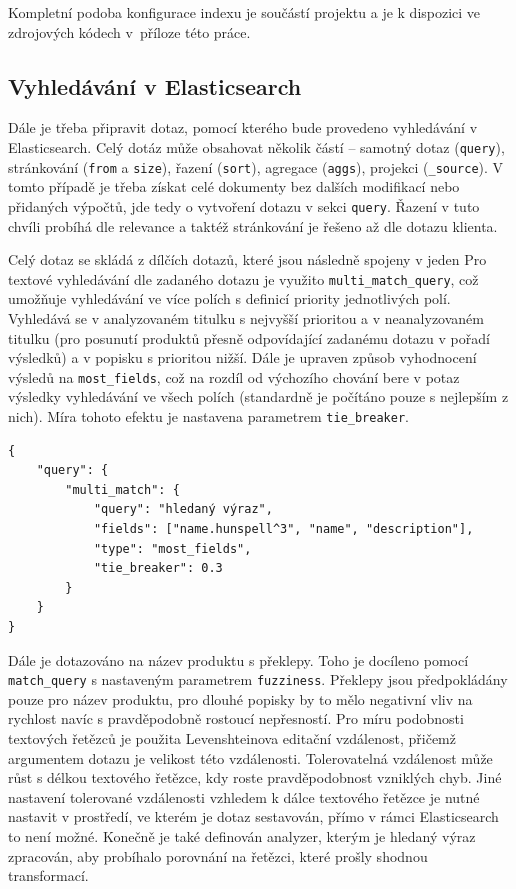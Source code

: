 \documentclass[FM,DP]{tulthesis}
\newenvironment{code}
    {\filbreak\captionsetup{type=listing}}{\filbreak}
\begin{document}
Kompletní podoba konfigurace indexu je součástí projektu a je k dispozici ve zdrojových kódech 
v~příloze této práce.

\subsection{Vyhledávání v Elasticsearch}

Dále je třeba připravit dotaz, pomocí kterého bude provedeno vyhledávání v Elasticsearch.
Celý dotáz může obsahovat několik částí -- samotný dotaz (\verb|query|), stránkování 
(\verb|from| a \verb|size|), řazení (\verb|sort|), agregace (\verb|aggs|), projekci
(\verb|_source|). V tomto případě je třeba získat celé dokumenty bez dalších modifikací
nebo přidaných výpočtů, jde tedy o vytvoření dotazu v sekci \verb|query|. Řazení v tuto 
chvíli probíhá dle relevance a taktéž stránkování je řešeno až dle dotazu klienta.

Celý dotaz se skládá z dílčích dotazů, které jsou následně spojeny v jeden
Pro textové vyhledávání dle zadaného dotazu je využito \verb|multi_match_query|, 
což umožňuje vyhledávání ve více polích s definicí priority jednotlivých polí.
Vyhledává se v analyzovaném titulku s nejvyšší prioritou a v neanalyzovaném titulku (pro posunutí
produktů přesně odpovídající zadanému dotazu v pořadí výsledků) a v popisku s prioritou nižší.
Dále je upraven způsob vyhodnocení výsledů na \verb|most_fields|, což na rozdíl
od výchozího chování bere v potaz výsledky vyhledávání ve všech polích (standardně je počítáno
pouze s nejlepším z nich). Míra tohoto efektu je nastavena parametrem \verb|tie_breaker|.

\begin{code}
\captionsetup{singlelinecheck=false,justification=raggedright}
\label{code:es-search-1}
\begin{verbatim}
{
    "query": {
        "multi_match": {
            "query": "hledaný výraz", 
            "fields": ["name.hunspell^3", "name", "description"],
            "type": "most_fields",
            "tie_breaker": 0.3
        }
    }
}
\end{verbatim}
\end{code}

Dále je dotazováno na název produktu s překlepy. Toho je docíleno pomocí \verb|match_query|
s nastaveným parametrem \verb|fuzziness|. Překlepy jsou předpokládány pouze pro název produktu, 
pro dlouhé popisky by to mělo negativní vliv na rychlost navíc s pravděpodobně rostoucí
nepřesností. Pro míru podobnosti textových řetězců je použita Levenshteinova editační
vzdálenost, přičemž argumentem dotazu je velikost této vzdálenosti. Tolerovatelná vzdálenost
může růst s délkou textového řetězce, kdy roste pravděpodobnost vzniklých chyb. Jiné
nastavení tolerované vzdálenosti vzhledem k dálce textového řetězce je nutné nastavit
v prostředí, ve kterém je dotaz sestavován, přímo v rámci Elasticsearch to není možné.
Konečně je také definován analyzer, kterým je hledaný výraz zpracován, aby probíhalo porovnání
na řetězci, které prošly shodnou transformací.
\end{document}
